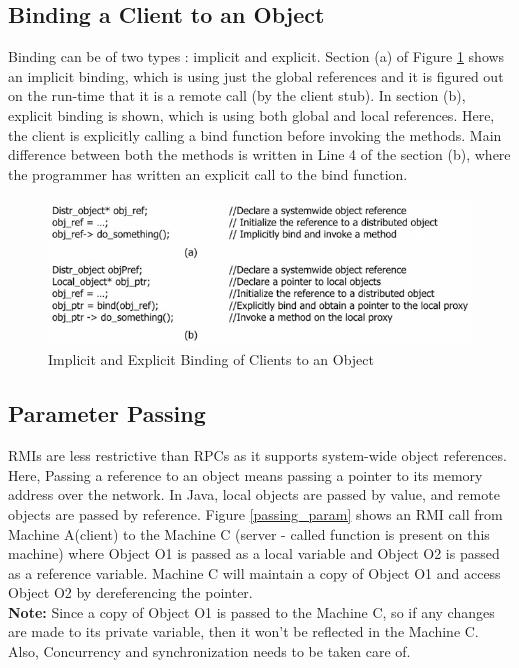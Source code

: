 \documentclass[twoside]{article}
\begin{document}
\subsection{Binding a Client to an Object}

Binding can be of two types : implicit and explicit. Section (a) of Figure \ref{binding_client} shows an implicit binding, which is using just the global references and it is figured out on the run-time that it is a remote call (by the client stub). In section (b), explicit binding is shown, which is using both global and local references. Here, the client is explicitly calling a bind function before invoking the methods.  Main difference between both the methods is written in Line 4 of the section (b), where the programmer has written an explicit call to the bind function.

\begin{figure}[h]
\begin{center}
\includegraphics[scale=0.6]{images/binding_client}
\caption{Implicit and Explicit Binding of Clients to an Object}
\label{binding_client}
\end{center}
\end{figure}

\subsection{Parameter Passing}

RMIs are less restrictive than RPCs as it supports system-wide object references. Here, Passing a reference to an object means passing a pointer to its memory address over the network. In Java, local objects are passed by value, and remote objects are passed by reference. Figure \ref{passing_param} shows an RMI call from Machine A(client) to the Machine C (server - called function is present on this machine) where Object O1 is passed as a local variable and Object O2 is passed as a reference variable. Machine C will maintain a copy of Object O1 and access Object O2 by dereferencing the pointer. \\
\textbf{Note:} Since a copy of Object O1 is passed to the Machine C, so if any changes are made to its private variable, then it won't be reflected in the Machine C. Also, Concurrency and synchronization needs to be taken care of.
\end{document}

